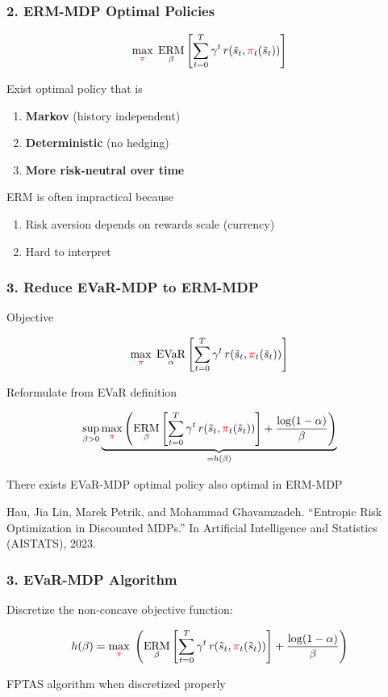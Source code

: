 \documentclass{beamer}
\newcommand{\tc}[2]{\textcolor{#1}{#2}}
\newcommand{\tcr}[1]{\tc{red}{#1}}
\DeclareMathOperator{\evaro}{EVaR}
\DeclareMathOperator{\ermo}{ERM}
\newcommand{\erm}[2]{\ermo_{#1}\left[#2\right]}
\newcommand{\evar}[2]{\evaro_{#1} \left[#2\right]}
\begin{document}
\begin{frame} \frametitle{2. ERM-MDP Optimal Policies}
    \[
        \max_{\tcr{\pi}} \; \erm{\beta}{\sum_{t=0}^T \gamma^t \, r(\tilde{s}_t, \tcr{\pi}_t(\tilde{s}_t)) }
    \]
    \vfill
    \begin{theorem}
    Exist optimal policy that is
    \begin{enumerate}
        \item \textbf{Markov} (history independent)
        \item \textbf{Deterministic} (no hedging)
        \item \textbf{More risk-neutral over time}
        \end{enumerate}
    \end{theorem}
    \vfill
    ERM is often impractical because
    \begin{enumerate}
    \item Risk aversion depends on rewards scale (currency)
    \item Hard to interpret 
    \end{enumerate}
  \end{frame}

\begin{frame} \frametitle{3. Reduce EVaR-MDP to ERM-MDP}
  Objective
  \begin{small}
    \[\max_{\tcr{\pi}}\;  \evar{\alpha}{\sum_{t=0}^T \gamma^t \, r(\tilde{s}_t, \tcr{\pi}_t(\tilde{s}_t)) } \]
  \end{small}
  \vfill 
  Reformulate from EVaR definition
  \begin{small}
    \[
        \sup_{\beta>0} \underbrace{\max_{\tcr{\pi}} \left(\erm{\beta}{\sum_{t=0}^T \gamma^t \, r(\tilde{s}_t, \tcr{\pi}_t(\tilde{s}_t)) } + \frac{\log(1 - \alpha)}{\beta}\right)}_{=h(\beta)}
    \]
  \end{small}
  \vfill 
  \begin{theorem}
    There exists EVaR-MDP optimal policy also optimal in ERM-MDP
  \end{theorem}
  {\tiny  Hau, Jia Lin, Marek Petrik, and Mohammad Ghavamzadeh. “Entropic Risk Optimization in Discounted MDPs.” In Artificial Intelligence and Statistics (AISTATS), 2023.}
\end{frame}

\begin{frame} \frametitle{3. EVaR-MDP Algorithm}
  Discretize the non-concave objective function:
  \begin{small}
  \[
   h(\beta) = \max_{\tcr\pi} \; \left(\erm{\beta}{\sum_{t=0}^T \gamma^t \, r(\tilde{s}_t, \tcr{\pi}_t(\tilde{s}_t)) } + \frac{\log(1 - \alpha)}{\beta}\right) 
 \]
  \end{small}
 \begin{center}
 \end{center}
 FPTAS algorithm when discretized properly
\end{frame}
\end{document}
